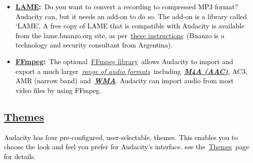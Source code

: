 \documentclass[letterpaper]{article}
\begin{document}
\begin{itemize}
\item
\href{https://manual.audacityteam.org/man/faq_installation_and_plug_ins.html#lame}{\textbf{\textcolor[rgb]{0.3529412,0.21176471,0.5882353}{LAME}}}\textbf{\textcolor{black}{:}}\textcolor{black}{~Do
you want to convert a recording to compressed MP3 format? Audacity can, but it needs an add-on to do so. The add-on is
a library called `LAME'. A free copy of LAME that is compatible with Audacity is available from the lame.buanzo.org
site, as
per~}\href{https://manual.audacityteam.org/man/faq_installation_and_plug_ins.html#lame}{\textcolor[rgb]{0.3529412,0.21176471,0.5882353}{these
instructions}}\textcolor{black}{~(Buanzo is a technology and security consultant from Argentina).}
\item
\href{https://manual.audacityteam.org/man/faq_installation_and_plug_ins.html#ffdown}{\textbf{\textcolor[rgb]{0.3529412,0.21176471,0.5882353}{FFmpeg}}}\textbf{\textcolor{black}{:}}\textcolor{black}{~The
optional~}\href{https://manual.audacityteam.org/man/faq_opening_and_saving_files.html#foreign}{\textcolor[rgb]{0.3529412,0.21176471,0.5882353}{FFmpeg
library}}\textcolor{black}{~allows Audacity to import and export a much
larger~}\href{https://wiki.audacityteam.org/wiki/FFmpeg_integration#Functionality}{\textit{\textcolor[rgb]{0.2,0.4,0.73333335}{range
of audio
formats}}}\textcolor{black}{~including~}\href{https://manual.audacityteam.org/man/glossary.html#aac}{\textbf{\textit{\textcolor[rgb]{0.3529412,0.21176471,0.5882353}{M4A
(AAC)}}}}\textcolor{black}{, AC3, AMR (narrow band)
and~}\href{https://manual.audacityteam.org/man/glossary.html#wma}{\textbf{\textit{\textcolor[rgb]{0.3529412,0.21176471,0.5882353}{WMA}}}}\textcolor{black}{.
Audacity can import audio from most video files by using FFmpeg.}
\end{itemize}
\subsection[Themes]{\href{https://manual.audacityteam.org/man/themes.html}{\textmd{\textcolor[rgb]{0.3529412,0.21176471,0.5882353}{Themes}}}}
\textcolor{black}{Audacity has four pre-configured, user-selectable, themes. This enables you to choose the look and
feel you prefer for Audacity's interface. see
the~}\href{https://manual.audacityteam.org/man/themes.html}{\textcolor[rgb]{0.3529412,0.21176471,0.5882353}{Themes}}\textcolor{black}{~page
for details.}
\end{document}
